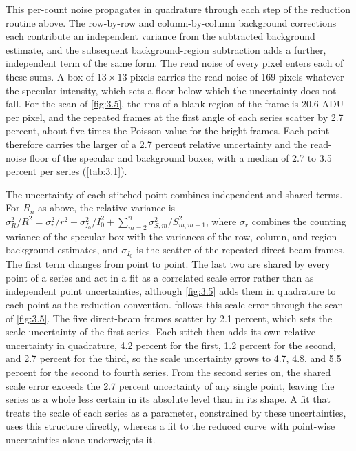 This per-count noise propagates in quadrature through each step of the reduction routine above. The row-by-row and column-by-column background corrections each contribute an independent variance from the subtracted background estimate, and the subsequent background-region subtraction adds a further, independent term of the same form. The read noise of every pixel enters each of these sums. A box of \(13 \times 13\) pixels carries the read noise of 169 pixels whatever the specular intensity, which sets a floor below which the uncertainty does not fall. For the scan of \cref{fig:3.5}, the rms of a blank region of the frame is 20.6 ADU per pixel, and the repeated frames at the first angle of each series scatter by 2.7 percent, about five times the Poisson value for the bright frames. Each point therefore carries the larger of a 2.7 percent relative uncertainty and the read-noise floor of the specular and background boxes, with a median of 2.7 to 3.5 percent per series (\cref{tab:3.1}).

The uncertainty of each stitched point combines independent and shared terms. For \(R_{n}\) as above, the relative variance is \(\sigma_{R}^{2}/R^{2} = \sigma_{r}^{2}/r^{2} + \sigma_{I_{0}}^{2}/I_{0}^{2} + \sum_{m = 2}^{n}\sigma_{S,m}^{2}/S_{m,m - 1}^{2}\), where \(\sigma_{r}\) combines the counting variance of the specular box with the variances of the row, column, and region background estimates, and \(\sigma_{I_{0}}\) is the scatter of the repeated direct-beam frames. The first term changes from point to point. The last two are shared by every point of a series and act in a fit as a correlated scale error rather than as independent point uncertainties, although \cref{fig:3.5} adds them in quadrature to each point as the reduction convention.  follows this scale error through the scan of \cref{fig:3.5}. The five direct-beam frames scatter by 2.1 percent, which sets the scale uncertainty of the first series. Each stitch then adds its own relative uncertainty in quadrature, 4.2 percent for the first, 1.2 percent for the second, and 2.7 percent for the third, so the scale uncertainty grows to 4.7, 4.8, and 5.5 percent for the second to fourth series. From the second series on, the shared scale error exceeds the 2.7 percent uncertainty of any single point, leaving the series as a whole less certain in its absolute level than in its shape. A fit that treats the scale of each series as a parameter, constrained by these uncertainties, uses this structure directly, whereas a fit to the reduced curve with point-wise uncertainties alone underweights it.

